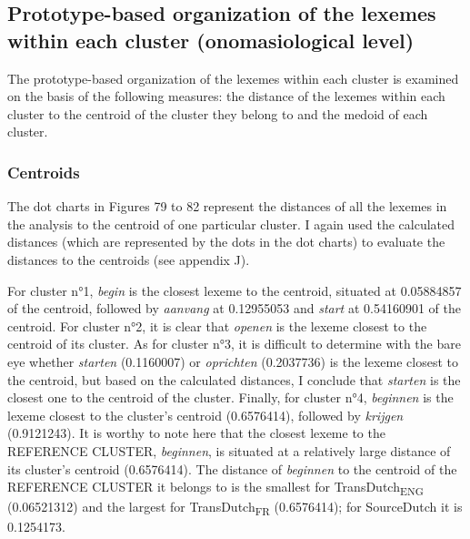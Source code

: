 \subsection{Prototype-based organization of the lexemes within each cluster (onomasiological level)}
\label{sec:4.4.3}  
The prototype-based organization of the lexemes within each cluster is examined on the basis of the following measures: the distance of the lexemes within each cluster to the centroid of the cluster they belong to and the medoid of each cluster.


\subsubsection{Centroids}
\label{sec:4.4.3.1}  
The dot charts in Figures 79 to 82 represent the distances of all the lexemes in the analysis to the centroid of one particular cluster. I again used the calculated distances (which are represented by the dots in the dot charts) to evaluate the distances to the centroids (see appendix J).

For cluster n°1, \textit{begin} is the closest lexeme to the centroid, situated at 0.05884857 of the centroid, followed by \textit{aanvang} at 0.12955053 and \textit{start} at 0.54160901 of the centroid. For cluster n°2, it is clear that \textit{openen} is the lexeme closest to the centroid of its cluster. As for cluster n°3, it is difficult to determine with the bare eye whether \textit{starten} (0.1160007) or \textit{oprichten} (0.2037736) is the lexeme closest to the centroid, but based on the calculated distances, I conclude that \textit{starten} is the closest one to the centroid of the cluster. Finally, for cluster n°4, \textit{beginnen} is the lexeme closest to the cluster’s centroid (0.6576414), followed by \textit{krijgen} (0.9121243). It is worthy to note here that the closest lexeme to the REFERENCE CLUSTER, \textit{beginnen}, is situated at a relatively large distance of its cluster’s centroid (0.6576414). The distance of \textit{beginnen} to the centroid of the REFERENCE CLUSTER it belongs to is the smallest for TransDutch\textsubscript{ENG} (0.06521312) and the largest for TransDutch\textsubscript{FR} (0.6576414); for SourceDutch it is 0.1254173.

